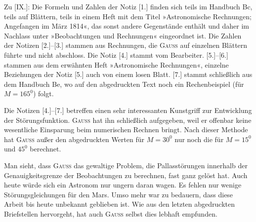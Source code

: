 \par\noindent\hspace*{\parindent}Zu [IX.]: Die Formeln und Zahlen der Notiz [1.] finden sich teils im
Handbuch Bc, teils auf Blättern, teils in einem Heft mit dem Titel »Astronomische Rechnungen;
Angefangen im März 1814«, das sonst andere Gegenstände enthält
und daher im Nachlass unter »Beobachtungen und Rechnungen« eingeordnet ist.
Die Zahlen der Notizen [2.]--[3.] stammen aus Rechnungen, die \textsc{Gauss} auf einzelnen Blättern
führte und nicht abschloss. Die Notiz [4.]
stammt vom Bearbeiter. [5.]--[6.] stammen aus dem erwähnten Heft »Astronomische Rechnungen«,
einzelne Beziehungen der Notiz [5.] auch von einem losen Blatt. [7.] stammt schließlich
aus dem Handbuch Be, wo auf den abgedruckten Text noch ein Rechenbeispiel
(für \(M=165^0\)) folgt.

\par\noindent\hspace*{\parindent}Die Notizen [4.]--[7.] betreffen einen sehr interessanten
Kunstgriff zur Entwicklung der Störungsfunktion. \textsc{Gauss} hat ihn
schließlich aufgegeben, weil er offenbar keine wesentliche Einsparung
beim numerischen Rechnen bringt. Nach dieser
Methode hat \textsc{Gauss} außer den abgedruckten Werten für \(M=30^0\) nur noch
die für \(M=15^0\) und \(45^0\) berechnet.

\medskip
\par\noindent\hspace*{\parindent}Man sieht, dass \textsc{Gauss} das gewaltige Problem, die
Pallasstörungen innerhalb der Genauigkeitsgrenze der Beobachtungen zu berechnen, fast ganz
gelöst hat. Auch heute würde sich ein Astronom nur ungern daran wagen.
Es fehlen nur wenige Störungsgleichungen für den Mars.
Umso mehr war zu bedauern, dass diese Arbeit bis heute
unbekannt geblieben ist. Wie aus den letzten abgedruckten Briefstellen
hervorgeht, hat auch \textsc{Gauss} selbst dies lebhaft empfunden.

